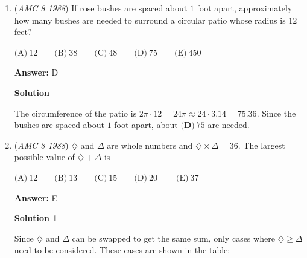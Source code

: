 \begin{enumerate}
 $\text{(A)}\ 20\text{ dollars} \qquad \text{(B)}\ 50\text{ dollars} \qquad \text{(C)}\ 80\text{ dollars} \qquad \text{(D)}\ 100\text{ dollars} \qquad \text{(E)}\ 125\text{ dollars}$

 \textbf{Answer: }C



\textbf{Solution 1}

The cost per person is $\frac{\$20\text{ billion}}{250\text{ million}} = \frac{\$20000\text{ million}}{250\text{ million}} = \boxed{\textbf{(C)}\ \$80}$.

 



\textbf{Solution 2}

The cost per person is $\frac{\$20\text{ billion}}{250\text{ million}} = \frac{\$20 \times 10^9}{250 \times 10^6} = \frac{\$20 \times 10\textasciicircum{}3}{250} = \frac{\$20000}{250} = \boxed{\textbf{(C)}\ \$80}$.

 


 


	\item (\textit{AMC 8 1988}) If rose bushes are spaced about $1$ foot apart, approximately how many bushes are needed to surround a circular patio whose radius is $12$ feet?


 $\text{(A)}\ 12 \qquad \text{(B)}\ 38 \qquad \text{(C)}\ 48 \qquad \text{(D)}\ 75 \qquad \text{(E)}\ 450$

 \textbf{Answer: }D



\textbf{Solution}

The circumference of the patio is $2\pi \cdot 12 = 24\pi \approx 24 \cdot 3.14 = 75.36$.  Since the bushes are spaced about $1$ foot apart, about $\boxed{\textbf{(D)}\ 75}$ are needed.

 


	\item (\textit{AMC 8 1988}) $\diamondsuit$ and $\Delta$ are whole numbers and $\diamondsuit \times \Delta =36$.  The largest possible value of $\diamondsuit + \Delta$ is 


 $\text{(A)}\ 12 \qquad \text{(B)}\ 13 \qquad \text{(C)}\ 15 \qquad \text{(D)}\ 20\ \qquad \text{(E)}\ 37$

 \textbf{Answer: }E



\textbf{Solution 1}

Since $\diamondsuit$ and $\Delta$ can be swapped to get the same sum, only cases where $\diamondsuit \geq \Delta$ need to be considered.  These cases are shown in the table:


\end{enumerate}
